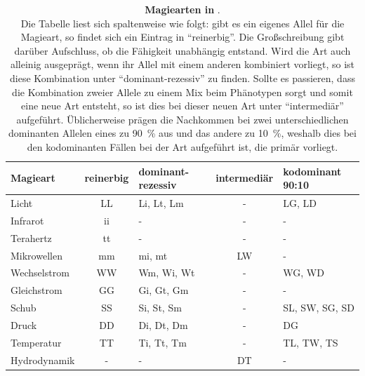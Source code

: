 \begin{table}[hbt]
	\centering
	\caption[Magiearten in ]%
	{\textbf{Magiearten in }. \\
		Die Tabelle liest sich spaltenweise wie folgt: gibt es ein eigenes Allel für die Magieart, so findet sich ein Eintrag in "`reinerbig"'.
		Die Großschreibung gibt darüber Aufschluss, ob die Fähigkeit unabhängig entstand.
		Wird die Art auch alleinig ausgeprägt, wenn ihr Allel mit einem anderen kombiniert vorliegt, so ist diese Kombination unter "`dominant-rezessiv"' zu finden.
		Sollte es passieren, dass die Kombination zweier Allele zu einem Mix beim Phänotypen sorgt und somit eine neue Art entsteht, so ist dies bei dieser neuen Art unter "`intermediär"' aufgeführt.
		Üblicherweise prägen die Nachkommen bei zwei unterschiedlichen dominanten Allelen eines zu \SI{90}{\percent} aus und das andere zu \SI{10}{\percent}, weshalb dies bei den kodominanten Fällen bei der Art aufgeführt ist, die primär vorliegt.} 
	\label{tab:landmagie}
	\begin{threeparttable}
		\begin{tabularx}{0.9\textwidth}{lcXcX}
			\toprule
			\textbf{Magieart} & \textbf{reinerbig} & \textbf{dominant-rezessiv} & \textbf{intermediär} & \textbf{kodominant 90:10} \\ \midrule
			Licht     &    LL     &    Li, Lt, Lm     &      -      &      LG, LD      \\ 
			Infrarot\tnote{2}    &    ii     &         -         &      -      &        -         \\ 
			Terahertz\tnote{3}   &    tt     &         -         &      -      &        -         \\ 
			Mikrowellen\tnote{1}  &    mm     &      mi, mt       &     LW      &        -         \\ 
			Wechselstrom  &    WW     &    Wm, Wi, Wt     &      -      &      WG, WD      \\ \midrule
			Gleichstrom  &    GG     &    Gi, Gt, Gm     &      -      &        -         \\ 
			Schub     &    SS     &    Si, St, Sm     &      -      &  SL, SW, SG, SD  \\ 
			Druck     &    DD     &    Di, Dt, Dm     &      -      &        DG        \\ 
			Temperatur   &    TT     &    Ti, Tt, Tm     &      -      &    TL, TW, TS    \\ \midrule
			Hydrodynamik  &     -     &         -         &     DT      &        -         \\

\end{tabularx}
\end{threeparttable}
\end{table}

